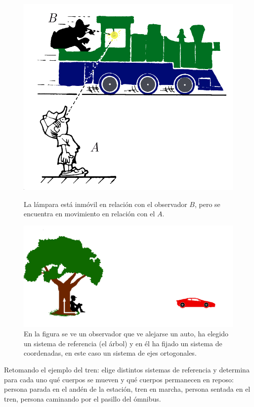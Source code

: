 \begin{figure}[H]
\centering
\begin{minipage}{.4\textwidth}
  \includegraphics[width=\textwidth]{img/tren.pdf}
  \caption{La lámpara está inmóvil en relación con el observador $B$, pero se encuentra en movimiento en relación con el $A$.}
\end{minipage}%
\hfill
\begin{minipage}{.55\textwidth}
  \includegraphics[width=\textwidth]{img/arbol.pdf}
  \caption{En la figura se ve un observador que ve alejarse un auto, ha elegido un sistema de  referencia (el árbol) y en él ha fijado un sistema de coordenadas, en este caso un sistema de ejes ortogonales.}
\end{minipage}
\end{figure}
    
\begin{comprension}
Retomando el ejemplo del tren: elige distintos sistemas de referencia y determina para cada uno qué cuerpos se mueven y qué cuerpos permanecen en reposo: persona parada en el andén de la estación, tren en marcha, persona sentada en el tren, persona caminando por el pasillo del ómnibus.
\end{comprension}


